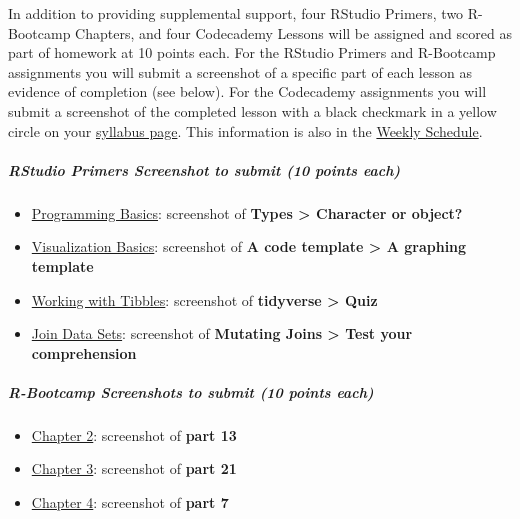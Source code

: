 \documentclass[
  letterpaper,
  DIV=11,
  numbers=noendperiod]{scrartcl}
\let\oldsubparagraph\subparagraph
\renewcommand{\subparagraph}[1]{\oldsubparagraph{#1}\mbox{}}
\providecommand{\tightlist}{%
  \setlength{\itemsep}{0pt}\setlength{\parskip}{0pt}}\usepackage{longtable,booktabs,array}
\begin{document}
In addition to providing supplemental support, four RStudio Primers, two
R-Bootcamp Chapters, and four Codecademy Lessons will be assigned and
scored as part of homework at 10 points each. For the RStudio Primers
and R-Bootcamp assignments you will submit a screenshot of a specific
part of each lesson as evidence of completion (see below). For the
Codecademy assignments you will submit a screenshot of the completed
lesson with a black checkmark in a yellow circle on your
\href{https://www.codecademy.com/learn/learn-r}{syllabus page}. This
information is also in the \href{INCLUDE\%20LINKE!!}{Weekly Schedule}.

\hypertarget{rstudio-primers-screenshot-to-submit-10-points-each}{%
\subparagraph{\texorpdfstring{\textbf{RStudio Primers Screenshot to
submit (10 points
each)}}{RStudio Primers Screenshot to submit (10 points each)}}\label{rstudio-primers-screenshot-to-submit-10-points-each}}

\begin{itemize}
\tightlist
\item
  \href{https://posit.cloud/learn/primers/1.2}{Programming Basics}:
  screenshot of \textbf{Types \textgreater{} Character or object?}
\item
  \href{https://posit.cloud/learn/primers/1.1}{Visualization Basics}:
  screenshot of \textbf{A code template \textgreater{} A graphing
  template}
\item
  \href{https://posit.cloud/learn/primers/2.1}{Working with Tibbles}:
  screenshot of \textbf{tidyverse \textgreater{} Quiz}
\item
  \href{https://posit.cloud/learn/primers/4.3}{Join Data Sets}:
  screenshot of \textbf{Mutating Joins \textgreater{} Test your
  comprehension}
\end{itemize}

\hypertarget{r-bootcamp-screenshots-to-submit-10-points-each}{%
\subparagraph{\texorpdfstring{\textbf{R-Bootcamp Screenshots to submit
(10 points
each)}}{R-Bootcamp Screenshots to submit (10 points each)}}\label{r-bootcamp-screenshots-to-submit-10-points-each}}

\begin{itemize}
\tightlist
\item
  \href{https://r-bootcamp.netlify.app/chapter2}{Chapter 2}: screenshot
  of \textbf{part 13}
\item
  \href{https://r-bootcamp.netlify.app/chapter3}{Chapter 3}: screenshot
  of \textbf{part 21}
\item
  \href{https://r-bootcamp.netlify.app/chapter4}{Chapter 4}: screenshot
  of \textbf{part 7}
\end{itemize}
\end{document}
